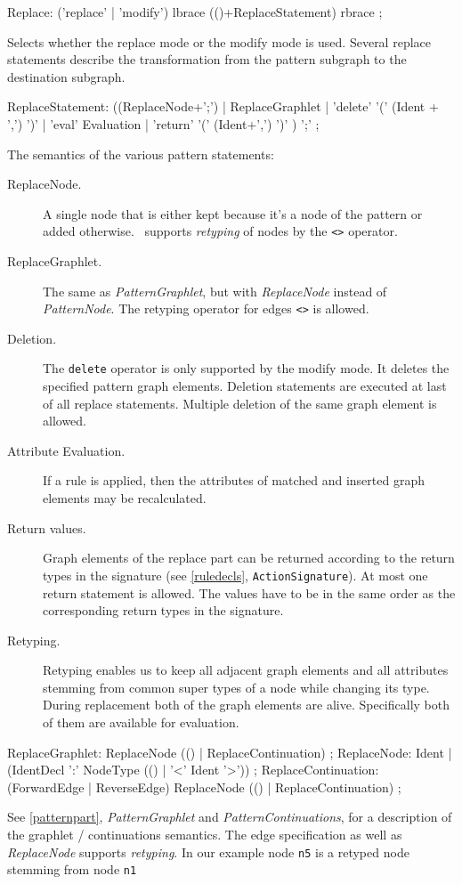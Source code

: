 \begin{rail}
  Replace: ('replace' | 'modify') lbrace (()+ReplaceStatement) rbrace ;
\end{rail}
Selects whether the replace mode or the modify mode is used. Several replace statements describe the transformation from the pattern subgraph to the destination subgraph.

\begin{rail}  
  ReplaceStatement: ((ReplaceNode+';') | 
    ReplaceGraphlet |
    'delete' '(' (Ident + ',') ')' |
    'eval' Evaluation |
    'return' '(' (Ident+',') ')' ) ';' ;
\end{rail}    
The semantics of the various pattern statements:
\begin{description}
  \item[ReplaceNode.] A single node that is either kept because it's a node of the pattern or added otherwise. \GrG\ supports \emph{retyping} of nodes by the \texttt{<>} operator.
  \item[ReplaceGraphlet.] The same as \emph{PatternGraphlet}, but with \emph{ReplaceNode} instead of \emph{PatternNode}. The retyping operator for edges \texttt{<>} is allowed.
  \item[Deletion.] The \texttt{delete} operator is only supported by the modify mode. It deletes the specified pattern graph elements. Deletion statements are executed at last of all replace statements. Multiple deletion of the same graph element is allowed.
  \item[Attribute Evaluation.] If a rule is applied, then the attributes of matched and inserted graph elements may be recalculated.
  \item[Return values.] Graph elements of the replace part can be returned according to the return types in the signature (see \ref{ruledecls}, \texttt{ActionSignature}). At most one return statement is allowed. The values have to be in the same order as the corresponding return types in the signature.
  \item[Retyping.] Retyping enables us to keep all adjacent graph elements and all attributes stemming from common super types of a node while changing its type. During replacement both of the graph elements are alive. Specifically both of them are available for evaluation.
\end{description}    
    


\begin{rail}
  ReplaceGraphlet: ReplaceNode (() | ReplaceContinuation) ;
  ReplaceNode: Ident | 
    (IdentDecl ':' NodeType (() | '<' Ident '>')) ;
  ReplaceContinuation:  (ForwardEdge | ReverseEdge) ReplaceNode (() | ReplaceContinuation) ;    
\end{rail}
See \ref{patternpart}, \emph{PatternGraphlet} and \emph{PatternContinuations}, for a description of the graphlet / continuations semantics. The edge specification as well as \emph{ReplaceNode} supports \emph{retyping}. In our example node \texttt{n5} is a retyped node stemming from node \texttt{n1}

